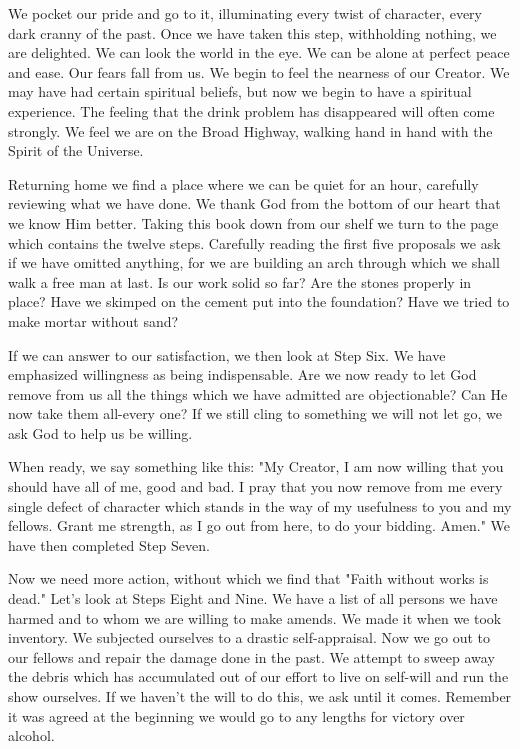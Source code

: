 \begin{biblechapter}
We pocket our pride and go to it, illuminating every twist of character, every dark cranny of the past.  Once we have taken this step, withholding nothing, we are delighted.  We can look the world in the eye.  We can be alone at perfect peace and ease.  Our fears fall from us.  We begin to feel the nearness of our Creator.  We may have had certain spiritual beliefs, but now we begin to have a spiritual experience.  The feeling that the drink problem has disappeared will often come strongly.  We feel we are on the Broad Highway, walking hand in hand with the Spirit of the Universe.

Returning home we find a place where we can be quiet for an hour, carefully reviewing what we have done.  We thank God from the bottom of our heart that we know Him better.  Taking this book down from our shelf we turn to the page which contains the twelve steps.  Carefully reading the first five proposals we ask if we have omitted anything, for we are building an arch through which we shall walk a free man at last.  Is our work solid so far?  Are the stones properly in place?  Have we skimped on the cement put into the foundation?  Have we tried to make mortar without sand?

If we can answer to our satisfaction, we then look at Step Six.  We have emphasized willingness as being indispensable.  Are we now ready to let God remove from us all the things which we have admitted are objectionable?  Can He now take them all-every one?  If we still cling to something we will not let go, we ask God to help us be willing.

When ready, we say something like this: "My Creator, I am now willing that you should have all of me, good and bad.  I pray that you now remove from me every single defect of character which stands in the way of my usefulness to you and my fellows.  Grant me strength, as I go out from here, to do your bidding.  Amen."  We have then completed Step Seven.

Now we need more action, without which we find that "Faith without works is dead."  Let's look at Steps Eight and Nine.  We have a list of all persons we have harmed and to whom we are willing to make amends.  We made it when we took inventory.  We subjected ourselves to a drastic self-appraisal.  Now we go out to our fellows and repair the damage done in the past.  We attempt to sweep away the debris which has accumulated out of our effort to live on self-will and run the show ourselves.  If we haven't the will to do this, we ask until it comes.  Remember it was agreed at the beginning we would go to any lengths for victory over alcohol.


\end{biblechapter}

